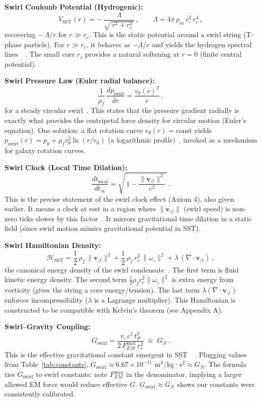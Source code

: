 \documentclass[aps,onecolumn,10pt,nofootinbib]{revtex4}
\newcommand{\swirlarrow}{\circlearrowleft} %
\newcommand{\vswirl}{\mathbf{v}_{\!\swirlarrow}}     %
\newcommand{\FmaxEM}{F^{\text{max}}_{\!EM}}
\begin{document}
	\begin{tcolorbox}[title=Master Equations of SST (v0.5.6)]
		\textbf{Swirl Coulomb Potential (Hydrogenic):}
		\[
			V_{\text{SST}}(r) = -\,\frac{\Lambda}{\sqrt{\,r^2 + r_c^2\,}}\,, \qquad \Lambda = 4\pi\,\rho_m\,v_{\circ}^2\,r_c^4\,,
		\]
		recovering $-\,\Lambda/r$ for $r \gg r_c$. This is the static potential around a swirl string (T-phase particle). For $r \gg r_c$, it behaves as $-\Lambda/r$ and yields the hydrogen spectral lines~\cite{index66}~\cite{index67}. The small core $r_c$ provides a natural softening at $r=0$ (finite central potential).

		\textbf{Swirl Pressure Law (Euler radial balance):}
		\[
			\frac{1}{\rho_f}\,\frac{d p_{\text{swirl}}}{dr} = \frac{v_{\theta}(r)^2}{r}\,,
		\]
		for a steady circular swirl~\cite{index68}. This states that the pressure gradient radially is exactly what provides the centripetal force density for circular motion (Euler’s equation). One solution: a flat rotation curve $v_{\theta}(r)=\text{const}$ yields $p_{\text{swirl}}(r) = p_0 + \rho_f v_{\theta}^2 \ln(r/r_0)$ (a logarithmic profile)~\cite{index69}, invoked as a mechanism for galaxy rotation curves.

		\textbf{Swirl Clock (Local Time Dilation):}
		\[
			\frac{dt_{\text{local}}}{dt_{\infty}} = \sqrt{\,1 - \frac{\|\vswirl\|^2}{c^2}\,}\,.
		\]
		This is the precise statement of the swirl clock effect (Axiom 4), also given earlier. It means a clock at rest in a region where $\|\vswirl\|$ (swirl speed) is non-zero ticks slower by this factor~\cite{index70}. It mirrors gravitational time dilation in a static field (since swirl motion mimics gravitational potential in SST).

		\textbf{Swirl Hamiltonian Density:}
		\[
			\mathcal{H}_{\text{SST}} = \frac{1}{2}\,\rho_f\,\|\vswirl\|^2 + \frac{1}{2}\,\rho_f\,r_c^2\,\|\omega_{\circ}\|^2 + \lambda\,(\nabla \cdot \vswirl)\,,
		\]
		the canonical energy density of the swirl condensate~\cite{index71}. The first term is fluid kinetic energy density. The second term $\frac{1}{2}\rho_f r_c^2 \|\omega_{\circ}\|^2$ is extra energy from vorticity (gives the string a core energy/tension). The last term $\lambda(\nabla\cdot\vswirl)$ enforces incompressibility ($\lambda$ is a Lagrange multiplier). This Hamiltonian is constructed to be compatible with Kelvin’s theorem (see Appendix A).

		\textbf{Swirl–Gravity Coupling:}
		\[
			G_{\text{swirl}} = \frac{v_{\circ}\,c^5\,t_P^2}{2\,\FmaxEM\,r_c^2} \;\approx\; G_N\,.
		\]
		This is the effective gravitational constant emergent in SST~\cite{index72}~\cite{index73}. Plugging values from Table~\ref{tab:constants}, $G_{\text{swirl}}\approx 6.67\times10^{-11}$ m$^3$/kg·s$^2 \approx G_N$. The formula ties $G_{\text{swirl}}$ to swirl constants: note $\FmaxEM$ in the denominator, implying a larger allowed EM force would reduce effective $G$. $G_{\text{swirl}}\approx G_N$ shows our constants were consistently calibrated.


\end{tcolorbox}
\end{document}
